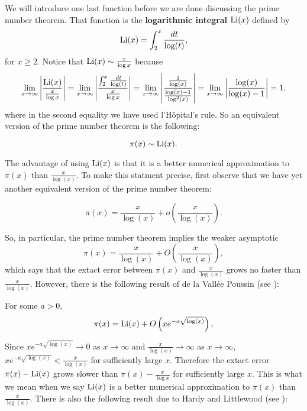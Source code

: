       We will introduce one last function before we are done discussing the prime number theorem. That function is the \textbf{logarithmic integral} $\operatorname{\mathrm{Li}}(x)$ defined by
      \[
        \operatorname{\mathrm{Li}}(x) = \int_{2}^{x}\frac{dt}{\log(t)},
      \]
      for $x \ge 2$. Notice that $\operatorname{\mathrm{Li}}(x) \sim \frac{x}{\log{x}}$ because
      \[
        \lim_{x \to \infty}\left|\frac{\operatorname{\mathrm{Li}}(x)}{\frac{x}{\log{x}}}\right| = \lim_{x \to \infty}\left|\frac{\int_{2}^{x}\frac{dt}{\log(t)}}{\frac{x}{\log{x}}}\right| = \lim_{x \to \infty}\left|\frac{\frac{1}{\log(x)}}{\frac{\log(x)-1}{\log^{2}(x)}}\right| = \lim_{x \to \infty}\left|\frac{\log(x)}{\log(x)-1}\right| = 1.
      \]
      where in the second equality we have used  l'H\^opital's rule. So an equivalent version of the prime number theorem is the following:

      \begin{theorem}
        \phantom{ }
        \[
          \pi(x) \sim \operatorname{\mathrm{Li}}(x).
        \]
      \end{theorem}

      The advantage of using $\operatorname{\mathrm{Li}}(x)$ is that it is a better numerical approximation to $\pi(x)$ than $\frac{x}{\log(x)}$. To make this statment precise, first observe that we have yet another equivalent version of the prime number theorem:

      \begin{theorem}
        \phantom{ }
        \[
          \pi(x) = \frac{x}{\log(x)}+o\left(\frac{x}{\log(x)}\right).
        \]
      \end{theorem}

      So, in particular, the prime number theorem implies the weaker asymptotic
      \[
        \pi(x) = \frac{x}{\log(x)}+O\left(\frac{x}{\log(x)}\right),
      \]
      which says that the extact error between $\pi(x)$ and $\frac{x}{\log(x)}$ grows no faster than $\frac{x}{\log(x)}$. However, there is the following result of de la Vall\'ee Poussin (see \cite{poussin1899fonction}):

      \begin{proposition}
        For some $a > 0$,
        \[
          \pi(x) = \operatorname{\mathrm{Li}}(x)+O\left(xe^{-a\sqrt{\log(x)}}\right),
        \]
      \end{proposition}
      
      Since $xe^{-a\sqrt{\log(x)}} \to 0$ as $x \to \infty$ and $\frac{x}{\log(x)} \to \infty$ as $x \to \infty$, $xe^{-a\sqrt{\log(x)}} < \frac{x}{\log(x)}$ for sufficiently large $x$. Therefore the extact error $\pi(x)-\operatorname{\mathrm{Li}}(x)$ grows slower than $\pi(x)-\frac{x}{\log{x}}$ for sufficiently large $x$. This is what we mean when we say $\operatorname{\mathrm{Li}}(x)$ is a better numerical approximation to $\pi(x)$ than $\frac{x}{\log(x)}$. There is also the following result due to Hardy and Littlewood (see \cite{hardy1916contributions}):

